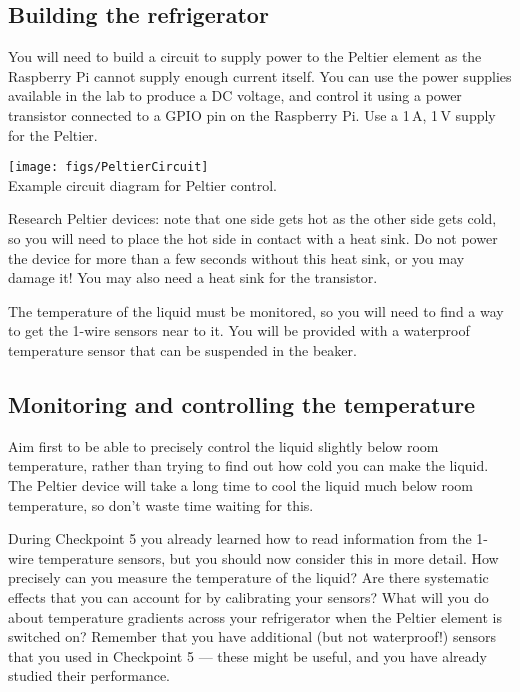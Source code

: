 \subsection{Building the refrigerator}

You will need to build a circuit to supply power to the Peltier element as the Raspberry Pi cannot supply enough current itself.
You can use the power supplies available in the lab to produce a DC voltage, and control it using a power transistor connected to a GPIO pin on the Raspberry Pi.
Use a 1\,A, 1\,V supply for the Peltier.

\begin{center}
	\texttt{[image: figs/PeltierCircuit]}\\
	{Example circuit diagram for Peltier control.}
\end{center}

Research Peltier devices: note that one side gets hot as the other side gets cold, so you will need to place the hot side in contact with a heat sink.
Do not power the device for more than a few seconds without this heat sink, or you may damage it!
You may also need a heat sink for the transistor.

The temperature of the liquid must be monitored, so you will need to find a way to get the 1-wire sensors near to it.
You will be provided with a waterproof temperature sensor that can be suspended in the beaker.

\subsection{Monitoring and controlling the temperature}

Aim first to be able to precisely control the liquid slightly below room temperature, rather than trying to find out how cold you can make the liquid.
The Peltier device will take a long time to cool the liquid much below room temperature, so don't waste time waiting for this.

During Checkpoint 5 you already learned how to read information from the 1-wire temperature sensors, but you should now consider this in more detail.
How precisely can you measure the temperature of the liquid?
Are there systematic effects that you can account for by calibrating your sensors?
What will you do about temperature gradients across your refrigerator when the Peltier element is switched on?
Remember that you have additional (but not waterproof!) sensors that you used in Checkpoint 5 --- these might be useful, and you have already studied their performance.

